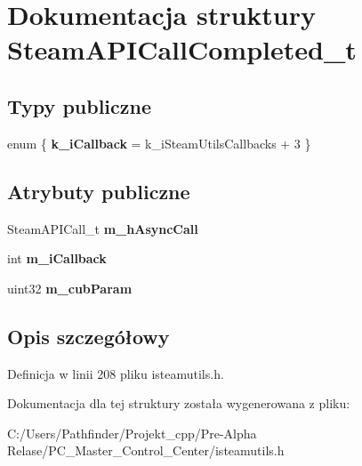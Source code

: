 \hypertarget{struct_steam_a_p_i_call_completed__t}{}\section{Dokumentacja struktury Steam\+A\+P\+I\+Call\+Completed\+\_\+t}
\label{struct_steam_a_p_i_call_completed__t}
\subsection*{Typy publiczne}
\begin{DoxyCompactItemize}
\item 
\mbox{\label{struct_steam_a_p_i_call_completed__t_af5d4eff73a6e87618739a248fc9178d4}} 
enum \{ {\bfseries k\+\_\+i\+Callback} = k\+\_\+i\+Steam\+Utils\+Callbacks + 3
 \}
\end{DoxyCompactItemize}
\subsection*{Atrybuty publiczne}
\begin{DoxyCompactItemize}
\item 
\mbox{\label{struct_steam_a_p_i_call_completed__t_a277d92c47fc823a6e52547049c491766}} 
Steam\+A\+P\+I\+Call\+\_\+t {\bfseries m\+\_\+h\+Async\+Call}
\item 
\mbox{\label{struct_steam_a_p_i_call_completed__t_a6cd76ec767987df9f35bdc2d0f9fa126}} 
int {\bfseries m\+\_\+i\+Callback}
\item 
\mbox{\label{struct_steam_a_p_i_call_completed__t_a066df1f70d474f3cd5674452f6ee07fb}} 
uint32 {\bfseries m\+\_\+cub\+Param}
\end{DoxyCompactItemize}


\subsection{Opis szczegółowy}


Definicja w linii 208 pliku isteamutils.\+h.



Dokumentacja dla tej struktury została wygenerowana z pliku\+:\begin{DoxyCompactItemize}
\item 
C\+:/\+Users/\+Pathfinder/\+Projekt\+\_\+cpp/\+Pre-\/\+Alpha Relase/\+P\+C\+\_\+\+Master\+\_\+\+Control\+\_\+\+Center/isteamutils.\+h\end{DoxyCompactItemize}
